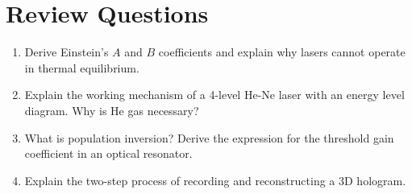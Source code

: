 \section{Review Questions}
\begin{enumerate}[leftmargin=*,itemsep=3pt]
    \item Derive Einstein's $A$ and $B$ coefficients and explain why lasers cannot operate in thermal equilibrium.
    \item Explain the working mechanism of a 4-level He-Ne laser with an energy level diagram. Why is He gas necessary?
    \item What is population inversion? Derive the expression for the threshold gain coefficient in an optical resonator.
    \item Explain the two-step process of recording and reconstructing a 3D hologram.
\end{enumerate}
